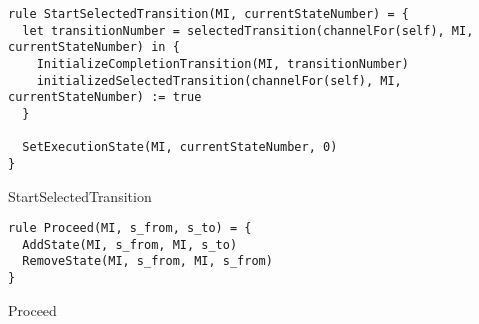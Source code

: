 \begin{listing}[H]
\begin{verbatim}
rule StartSelectedTransition(MI, currentStateNumber) = {
  let transitionNumber = selectedTransition(channelFor(self), MI, currentStateNumber) in {
    InitializeCompletionTransition(MI, transitionNumber)
    initializedSelectedTransition(channelFor(self), MI, currentStateNumber) := true
  }

  SetExecutionState(MI, currentStateNumber, 0)
}
\end{verbatim}
\caption{StartSelectedTransition}
\label{lst:asm:StartSelectedTransition}
\end{listing}






\begin{listing}[H]
\begin{verbatim}
rule Proceed(MI, s_from, s_to) = {
  AddState(MI, s_from, MI, s_to)
  RemoveState(MI, s_from, MI, s_from)
}
\end{verbatim}
\caption{Proceed}
\label{lst:asm:Proceed}
\end{listing}




